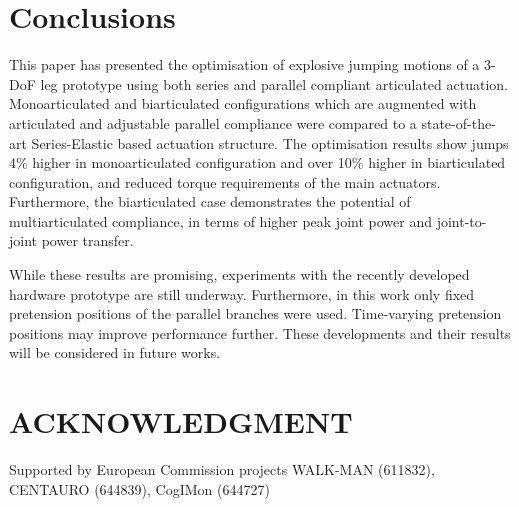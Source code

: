 \documentclass[letterpaper, 10 pt, conference]{ieeeconf}  %
\begin{document}
\section{Conclusions} \label{sec:conclusions} 
This paper has presented the optimisation of explosive jumping motions of a 3-DoF leg prototype using both series and parallel compliant articulated actuation. Monoarticulated and biarticulated configurations which are augmented with articulated and adjustable parallel compliance were compared to a state-of-the-art Series-Elastic based actuation structure. The optimisation results show jumps 4\% higher in monoarticulated configuration and over 10\% higher in biarticulated configuration, and reduced torque requirements of the main actuators. Furthermore, the biarticulated case demonstrates the potential of multiarticulated compliance, in terms of higher peak joint power and joint-to-joint power transfer.

While these results are promising, experiments with the recently developed hardware prototype are still underway. Furthermore, in this work only fixed pretension positions of the parallel branches were used. Time-varying pretension positions may improve performance further. These developments and their results will be considered in future works.


\addtolength{\textheight}{-0cm}   %


\section{ACKNOWLEDGMENT}
Supported by European Commission projects WALK-MAN (611832), CENTAURO (644839), CogIMon (644727)



\end{document}
